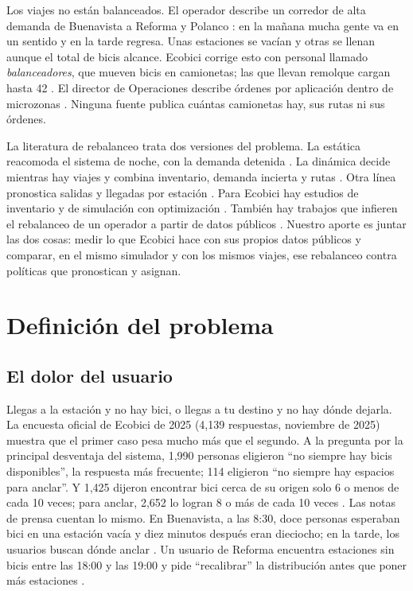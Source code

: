 \documentclass[conference,letterpaper,10pt]{IEEEtran}
\begin{document}
Los viajes no están balanceados. El operador describe un corredor de alta demanda de Buenavista a Reforma y Polanco \cite{mbn2026}: en la mañana mucha gente va en un sentido y en la tarde regresa. Unas estaciones se vacían y otras se llenan aunque el total de bicis alcance. Ecobici corrige esto con personal llamado \emph{balanceadores}, que mueven bicis en camionetas; las que llevan remolque cargan hasta 42 \cite{expansion2026}. El director de Operaciones describe órdenes por aplicación dentro de microzonas \cite{mbn2026}. Ninguna fuente publica cuántas camionetas hay, sus rutas ni sus órdenes.

La literatura de rebalanceo trata dos versiones del problema. La estática reacomoda el sistema de noche, con la demanda detenida \cite{raviv2013static,chemla2013,dellamico2014}. La dinámica decide mientras hay viajes y combina inventario, demanda incierta y rutas \cite{schuijbroek2017,zhang2017timespace,dellamico2018,legros2019,brinkmann2019,liang2024}. Otra línea pronostica salidas y llegadas por estación \cite{li2015traffic,chen2016overdemand}. Para Ecobici hay estudios de inventario y de simulación con optimización \cite{coronado2018,gomez2021,possani2021}. También hay trabajos que infieren el rebalanceo de un operador a partir de datos públicos \cite{medard2016,luo2026}. Nuestro aporte es juntar las dos cosas: medir lo que Ecobici hace con sus propios datos públicos y comparar, en el mismo simulador y con los mismos viajes, ese rebalanceo contra políticas que pronostican y asignan.

\section{Definición del problema}
\subsection{El dolor del usuario}
Llegas a la estación y no hay bici, o llegas a tu destino y no hay dónde dejarla. La encuesta oficial de Ecobici de 2025 (4,139 respuestas, noviembre de 2025) muestra que el primer caso pesa mucho más que el segundo. A la pregunta por la principal desventaja del sistema, 1,990 personas eligieron ``no siempre hay bicis disponibles'', la respuesta más frecuente; 114 eligieron ``no siempre hay espacios para anclar''. Y 1,425 dijeron encontrar bici cerca de su origen solo 6 o menos de cada 10 veces; para anclar, 2,652 lo logran 8 o más de cada 10 veces \cite{encuesta2025}. Las notas de prensa cuentan lo mismo. En Buenavista, a las 8:30, doce personas esperaban bici en una estación vacía y diez minutos después eran dieciocho; en la tarde, los usuarios buscan dónde anclar \cite{expansion2026cronica}. Un usuario de Reforma encuentra estaciones sin bicis entre las 18:00 y las 19:00 y pide ``recalibrar'' la distribución antes que poner más estaciones \cite{eluniversal2026}.
\end{document}

